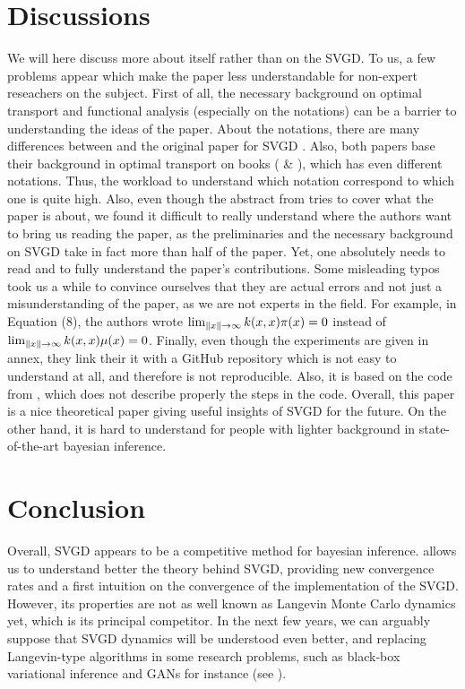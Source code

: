 \documentclass{article}
\DeclarePairedDelimiter{\norm}{\|}{\|}
\begin{document}
\section{Discussions}
We will here discuss more about \cite{main-paper} itself rather than on the SVGD. To us, a few problems appear  which make the paper less understandable for non-expert reseachers on the subject. \newline
First of all, the necessary background on optimal transport and functional analysis (especially on the notations) can be a barrier to understanding the ideas of the paper. About the notations, there are many differences between \cite{main-paper} and the original paper for SVGD \cite{Original-SVGD}. Also, both papers base their background in optimal transport on books (\cite{villani2003} \& \cite{villani2008}), which has even different notations. Thus, the workload to understand which notation correspond to which one is quite high. \newline
Also, even though the abstract from \cite{main-paper} tries to cover what the paper is about, we found it difficult to really understand where the authors want to bring us reading the paper, as the preliminaries and the necessary background on SVGD take in fact more than half of the paper.
Yet, one absolutely needs to read \cite{Original-SVGD} and \cite{SVGD-flow} to fully understand the paper's contributions. \newline
Some misleading typos took us a while to convince ourselves that they are actual errors and not
just a misunderstanding of the paper, as we are not experts in the field. For example,
in Equation (8), the authors wrote $\lim_{\norm{x} \to \infty} k(x, x)\pi(x) = 0$ instead of $\lim_{\norm{x} \to \infty} k(x, x)\mu(x) = 0$. \newline
Finally, even though the experiments are given in annex, they link their it with a GitHub repository which is not easy to understand at all, and therefore is not reproducible. Also, it is based on the code from \cite{Original-SVGD}, which does not describe properly the steps in the code. \newline
Overall, this paper is a nice theoretical paper giving useful insights of SVGD for the future. On the other hand, it is hard to understand for people with lighter background in state-of-the-art bayesian inference.
 
\section{Conclusion}
Overall, SVGD appears to be a competitive method for bayesian inference. \cite{main-paper} allows us to understand better the theory behind SVGD,
providing new convergence rates and a first intuition on the convergence of the implementation of the SVGD. However, its properties are not as well known as Langevin Monte Carlo dynamics yet, which is its principal competitor. In the next few years, we can arguably suppose that SVGD dynamics will be understood even better, and replacing Langevin-type algorithms in some research problems, such as black-box variational inference and GANs for instance (see \cite{ccl}). 
\end{document}
